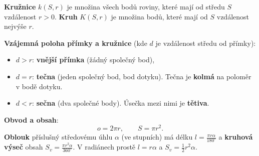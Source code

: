 \begin{definitionbox}
  \textbf{Kružnice} $k(S, r)$ je množina všech bodů roviny, které mají od středu $S$ vzdálenost $r > 0$. \textbf{Kruh} $K(S, r)$ je množina bodů, které mají od $S$ vzdálenost nejvýše $r$.

  \vspace{0.2cm}

  \textbf{Vzájemná poloha přímky a kružnice} (kde $d$ je vzdálenost středu od přímky):
  \begin{itemize}
    \item $d > r$: \textbf{vnější přímka} (žádný společný bod),
    \item $d = r$: \textbf{tečna} (jeden společný bod, bod dotyku). Tečna je \textbf{kolmá} na poloměr v bodě dotyku.
    \item $d < r$: \textbf{sečna} (dva společné body). Úsečka mezi nimi je \textbf{tětiva}.
  \end{itemize}

  \textbf{Obvod a obsah}:
  \begin{equation*}
    o = 2\pi r,\qquad S = \pi r^2.
  \end{equation*}
  \textbf{Oblouk} příslušný středovému úhlu $\alpha$ (ve stupních) má délku $l = \frac{\pi r\alpha}{180^\circ}$ a \textbf{kruhová výseč} obsah $S_v = \frac{\pi r^2\alpha}{360^\circ}$. V radiánech prostě $l = r\alpha$ a $S_v = \frac{1}{2}r^2\alpha$.
\end{definitionbox}

